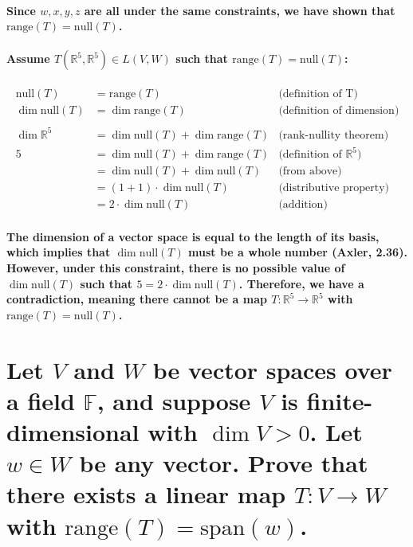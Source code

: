 \documentclass{article}
\begin{document}
\paragraph{\large
Since $w,x,y,z$ are all under the same constraints, we have shown that $\mathrm{range}(T)=\mathrm{null}(T)$.}

\paragraph{\large
Assume $T(\mathbb{R}^5, \mathbb{R}^5) \in L(V, W)$ such that $\mathrm{range}(T) = \mathrm{null}(T)$:}

\begin{align*}
    \mathrm{null}(T) &= \mathrm{range}(T) & \text{(definition of T)}\\
    \dim \mathrm{null}(T) &= \dim \mathrm{range}(T) & \text{(definition of dimension)}\\\\
    \dim \mathbb{R}^5 &= \dim \mathrm{null}(T) + \dim \mathrm{range}(T) & \text{(rank-nullity theorem)}\\
    5 &= \dim \mathrm{null}(T) + \dim \mathrm{range}(T) & \text{(definition of $\mathbb{R}^5$)}\\
    &= \dim \mathrm{null}(T) + \dim \mathrm{null}(T) & \text{(from above)}\\
    &= (1 + 1) \cdot \dim \mathrm{null}(T) & \text{(distributive property)}\\
    &= 2 \cdot \dim \mathrm{null}(T) & \text{(addition)}
\end{align*}

\paragraph{\large
The dimension of a vector space is equal to the length of its basis, which implies that $\dim \mathrm{null}(T)$ must be a whole number (Axler, 2.36). However, under this constraint, there is no possible value of $\dim \mathrm{null}(T)$ such that $5 = 2 \cdot \dim \mathrm{null}(T)$. Therefore, we have a contradiction, meaning there cannot be a map $T: \mathbb{R}^5 \rightarrow \mathbb{R}^5$ with $\mathrm{range}(T) = \mathrm{null}(T)$.}

\newpage

\section{Let $V$ and $W$ be vector spaces over a field $\mathbb{F}$, and suppose $V$ is finite-dimensional with $\dim V > 0$. Let $w \in W$ be any vector. Prove that there exists a linear map $T: V \rightarrow W$ with $\mathrm{range}(T) = \mathrm{span}(w)$.}
\end{document}
